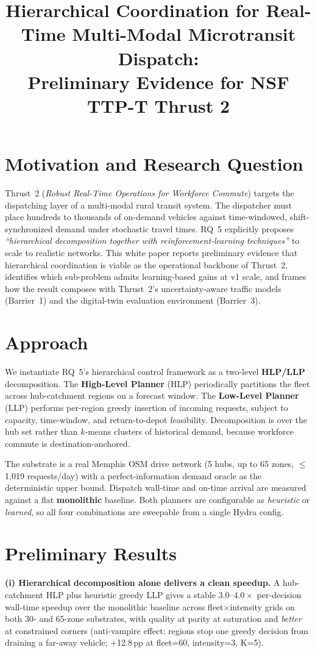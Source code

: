 \documentclass[11pt]{article}
\title{\vspace{-2em}\textbf{Hierarchical Coordination for Real-Time
Multi-Modal Microtransit Dispatch:\\
Preliminary Evidence for NSF TTP-T Thrust 2}\vspace{-0.5em}}
\author{}
\date{}
\begin{document}
\maketitle
\vspace{-3em}

\section{Motivation and Research Question}
Thrust~2 (\emph{Robust Real-Time Operations for Workforce Commute}) targets
the dispatching layer of a multi-modal rural transit system. The dispatcher
must place hundreds to thousands of on-demand vehicles against time-windowed,
shift-synchronized demand under stochastic travel times. RQ~5 explicitly
proposes \textit{``hierarchical decomposition together with
reinforcement-learning techniques''} to scale to realistic networks. This
white paper reports preliminary evidence that hierarchical coordination is
viable as the operational backbone of Thrust~2, identifies which sub-problem
admits learning-based gains at v1 scale, and frames how the result composes
with Thrust~2's uncertainty-aware traffic models (Barrier~1) and the
digital-twin evaluation environment (Barrier~3).

\section{Approach}
We instantiate RQ~5's hierarchical control framework as a two-level
\textbf{HLP/LLP} decomposition. The \textbf{High-Level Planner} (HLP)
periodically partitions the fleet across hub-catchment regions on a forecast
window. The \textbf{Low-Level Planner} (LLP) performs per-region greedy
insertion of incoming requests, subject to capacity, time-window, and
return-to-depot feasibility. Decomposition is over the hub set rather than
$k$-means clusters of historical demand, because workforce commute is
destination-anchored.

The substrate is a real Memphis OSM drive network (5 hubs, up to 65 zones,
$\le$1{,}019 requests/day) with a perfect-information demand oracle as the
deterministic upper bound. Dispatch wall-time and on-time arrival are
measured against a flat \textbf{monolithic} baseline. Both planners are
configurable as \textit{heuristic} or \textit{learned}, so all four
combinations are sweepable from a single Hydra config.

\section{Preliminary Results}
\textbf{(i) Hierarchical decomposition alone delivers a clean speedup.} A
hub-catchment HLP plus heuristic greedy LLP gives a stable
$3.0\text{--}4.0\times$ per-decision wall-time speedup over the monolithic
baseline across fleet$\times$intensity grids on both 30- and 65-zone
substrates, with quality at parity at saturation and \emph{better} at
constrained corners (anti-vampire effect: regions stop one greedy decision
from draining a far-away vehicle; +12.8\,pp at fleet=60, intensity=3, K=5).
\end{document}
